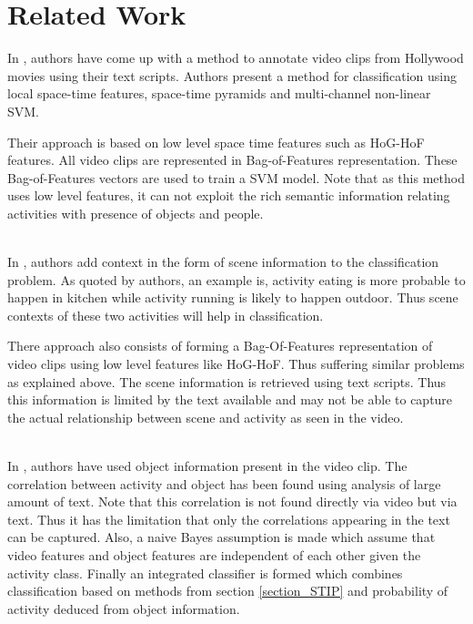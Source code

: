 \chapter{Related Work}

\label{ch3_RELATED}

In \cite{Realistic}, authors have come up with a method to annotate video clips 
from Hollywood movies using their text scripts.
Authors present a method for classification using local space-time features, 
space-time pyramids and multi-channel non-linear SVM. 

Their approach is based on low level space time features such as HoG-HoF features. 
All video clips are represented in Bag-of-Features representation. 
These Bag-of-Features vectors are used to train a SVM model. 
Note that as this method uses low level features, it can not exploit the 
rich semantic information relating activities with presence of objects and people.


~\\
In \cite{actionsInContext}, authors add context in the form of scene information to the classification problem. 
As quoted by authors, an example is, activity eating is more probable to happen in kitchen 
while activity running is likely to happen outdoor. Thus scene contexts of these two activities will help in classification.

There approach also consists of forming a Bag-Of-Features representation of video clips
using low level features like HoG-HoF. Thus suffering similar problems as explained above. 
The scene information is retrieved using text scripts.
Thus this information is limited by the text available 
and may not be able to capture the actual relationship between
scene and activity as seen in the video.

~\\
In \cite{improving}, authors have used object information present in the video clip. 
The correlation between activity and object has been found using analysis of large amount of text. 
Note that this correlation is not found directly via video but via text.
Thus it has the limitation that only the correlations appearing in the text can be captured.
Also, a naive Bayes assumption is made which assume that video features 
and object features are independent of each other given the activity class.
Finally an integrated classifier is formed which combines classification based on methods from section \ref{section_STIP} 
and probability of activity deduced from object information.

